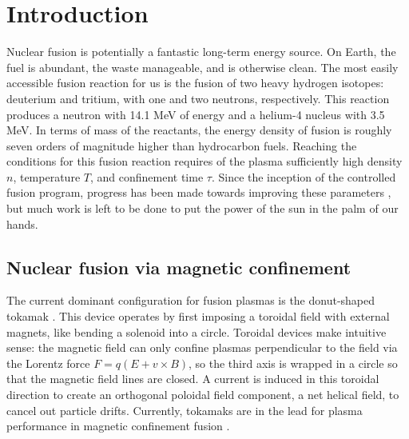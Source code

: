 \graphicspath{{Chapters/Chapter_intro/}}

\chapter{Introduction}
\label{ch:intro}

Nuclear fusion is potentially a fantastic long-term energy source. On Earth, the fuel is abundant, the waste manageable, and is otherwise clean. The most easily accessible fusion reaction for us is the fusion of two heavy hydrogen isotopes: deuterium and tritium, with one and two neutrons, respectively. This reaction produces a neutron with 14.1 MeV of energy and a helium-4 nucleus with 3.5 MeV. In terms of mass of the reactants, the energy density of fusion is roughly seven orders of magnitude higher than hydrocarbon fuels. Reaching the conditions for this fusion reaction requires of the plasma sufficiently high density $n$, temperature $T$, and confinement time $\tau$. Since the inception of the controlled fusion program, progress has been made towards improving these parameters \cite{wurzel_progress_2022}, but much work is left to be done to put the power of the sun in the palm of our hands.

\section{Nuclear fusion via magnetic confinement}

The current dominant configuration for fusion plasmas is the donut-shaped tokamak \cite{john_wesson_tokamaks_2004}. This device operates by first imposing a toroidal field with external magnets, like bending a solenoid into a circle. Toroidal devices make intuitive sense: the magnetic field can only confine plasmas perpendicular to the field via the Lorentz force $F = q(E + v \times B)$, so the third axis is wrapped in a circle so that the magnetic field lines are closed. A current is induced in this toroidal direction to create an orthogonal poloidal field component, a net helical field, to cancel out particle drifts. Currently, tokamaks are in the lead for plasma performance in magnetic confinement fusion \cite{wurzel_progress_2022}.

